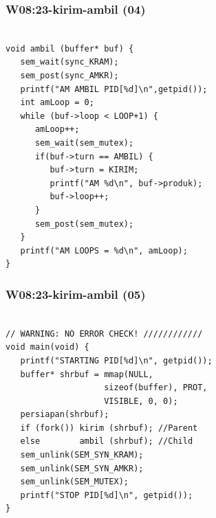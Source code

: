 \documentclass[xcolor=table, notheorems, hyperref={pdfpagelabels=false}]{beamer}
\begin{document}
\begin{frame}[fragile]
\frametitle{W08:23-kirim-ambil (04)}
\begin{lstlisting}[basicstyle=\ttfamily\small]        %  65
% \begin{lstlisting}[basicstyle=\ttfamily\large]        %  54

void ambil (buffer* buf) {
   sem_wait(sync_KRAM);
   sem_post(sync_AMKR);
   printf("AM AMBIL PID[%d]\n",getpid());
   int amLoop = 0;
   while (buf->loop < LOOP+1) {
      amLoop++;
      sem_wait(sem_mutex);
      if(buf->turn == AMBIL) {
         buf->turn = KIRIM;
         printf("AM %d\n", buf->produk);
         buf->loop++;
      }
      sem_post(sem_mutex);
   }
   printf("AM LOOPS = %d\n", amLoop);
}

\end{lstlisting}
\end{frame}

\begin{frame}[fragile]
\frametitle{W08:23-kirim-ambil (05)}
\begin{lstlisting}[basicstyle=\ttfamily\large]        %  54

// WARNING: NO ERROR CHECK! ////////////
void main(void) {
   printf("STARTING PID[%d]\n", getpid());
   buffer* shrbuf = mmap(NULL,
                    sizeof(buffer), PROT, 
                    VISIBLE, 0, 0);
   persiapan(shrbuf);
   if (fork()) kirim (shrbuf); //Parent
   else        ambil (shrbuf); //Child
   sem_unlink(SEM_SYN_KRAM);
   sem_unlink(SEM_SYN_AMKR);
   sem_unlink(SEM_MUTEX);
   printf("STOP PID[%d]\n", getpid());
}


\end{lstlisting}
\end{frame}
\end{document}
